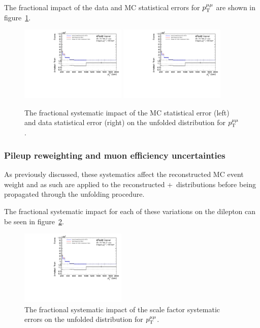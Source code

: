 The fractional impact of the data and MC statistical errors for $p_\mathrm{T}^{\mu\mu}$ are shown in figure~\ref{fig:MCDataStatErr}.

\begin{figure}[h!]
  \centering
  \includegraphics[page=34,width=0.45\textwidth]{figures/IBUPlots.pdf}
  \includegraphics[page=36,width=0.45\textwidth]{figures/IBUPlots.pdf}
  \caption{The fractional systematic impact of the MC statistical error (left) and data statistical error (right) on the unfolded distribution for $p_\mathrm{T}^{\mu\mu}$.}
  \label{fig:MCDataStatErr}
\end{figure}

\subsubsection{Pileup reweighting and muon efficiency uncertainties}
As previously discussed, these systematics affect the reconstructed MC event weight and as such are applied to the reconstructed \powheg+\pythia~distributions before being propagated through the unfolding procedure.

The fractional systematic impact for each of these variations on the dilepton \pt can be seen in figure~\ref{fig:SFSystErr}.

\begin{figure}[h!]
  \centering
  \includegraphics[page=30,width=0.45\textwidth]{figures/IBUPlots.pdf}
  \caption{The fractional systematic impact of the scale factor systematic errors on the unfolded distribution for $p_\mathrm{T}^{\mu\mu}$.}
  \label{fig:SFSystErr}
\end{figure}

